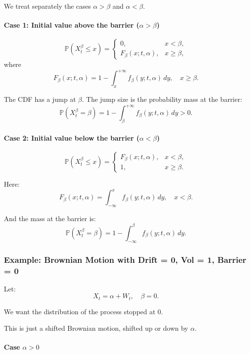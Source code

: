 \documentclass[12pt,a4paper]{article}
\theoremstyle{definition}
\begin{document}
We treat separately the cases $\alpha > \beta$ and $\alpha < \beta$.

\paragraph{Case 1: Initial value above the barrier ($\alpha > \beta$)}

\[
\mathbb{P}(X_t^\beta \leq x) = \begin{cases}
0, & x < \beta, \\
F_\beta(x; t, \alpha), & x \geq \beta,
\end{cases}
\]
where
\[
F_\beta(x; t, \alpha) = 1 - \int_x^{+\infty} f_\beta(y; t, \alpha)\, dy, \quad x \geq \beta.
\]

The CDF has a jump at $\beta$. The jump size is the probability mass at the barrier:
\[
\mathbb{P}(X_t^\beta = \beta) = 1 - \int_\beta^{+\infty} f_\beta(y; t, \alpha)\, dy > 0.
\]

\paragraph{Case 2: Initial value below the barrier ($\alpha < \beta$)}

\[
\mathbb{P}(X_t^\beta \leq x) = \begin{cases}
F_\beta(x; t, \alpha), & x < \beta, \\
1, & x \geq \beta.
\end{cases}
\]

Here:
\[
F_\beta(x; t, \alpha) = \int_{-\infty}^x f_\beta(y; t, \alpha)\, dy, \quad x < \beta.
\]

And the mass at the barrier is:
\[
\mathbb{P}(X_t^\beta = \beta) = 1 - \int_{-\infty}^\beta f_\beta(y; t, \alpha)\, dy.
\]

\subsubsection{Example: Brownian Motion with Drift = 0, Vol = 1, Barrier = 0}

Let:
\[
X_t = \alpha + W_t, \quad \beta = 0.
\]

We want the distribution of the process stopped at 0.

This is just a shifted Brownian motion, shifted up or down by $\alpha$.

\paragraph{Case $\alpha > 0$}
\end{document}
